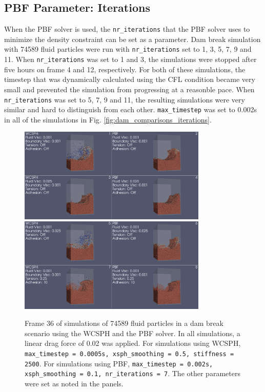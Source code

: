 \documentclass[11pt, letterpaper, twocolumn]{article}
\begin{document}
\subsection{PBF Parameter: Iterations}
\label{subsec:pbf_param_iterations}
When the PBF solver is used, the \texttt{nr\_iterations} that the PBF solver uses to minimize the density constraint can be set as a parameter. Dam break simulation with 74589 fluid particles were run with \texttt{nr\_iterations} set to 1, 3, 5, 7, 9 and 11. When \texttt{nr\_iterations} was set to 1 and 3, the simulations were stopped after five hours on frame 4 and 12, respectively. For both of these
simulations, the timestep that was dynamically calculated using the CFL condition became very small and prevented the simulation from progressing at a reasonble pace. When \texttt{nr\_iterations} was set to 5, 7, 9 and 11, the resulting simulations were very similar and hard to distinguish from each other. \texttt{max\_timestep} was set to 0.002s in all of the simulations in Fig. \ref{fig:dam_comparisons_iterations}. 
  
\begin{figure}
  \centering
  \includegraphics[width=0.8\textwidth]{images/smallDam_IX_X.0036.png}
  \includegraphics[width=0.8\textwidth]{images/smallDam_XI_XII.0036.png}
  \caption{Frame 36 of simulations of 74589 fluid particles in a dam break scenario using the WCSPH and the PBF solver. In all simulations, a linear drag force of 0.02 was applied. For simulations using WCSPH, \texttt{max\_timestep = 0.0005s,
  xsph\_smoothing = 0.5, stiffness = 2500}. For simulations using PBF, \texttt{max\_timestep = 0.002s, xsph\_smoothing = 0.1, nr\_iterations = 7}. The other parameters were set as noted in the panels.}
  \label{fig:dam_comparisons}
\end{figure}
\end{document}
